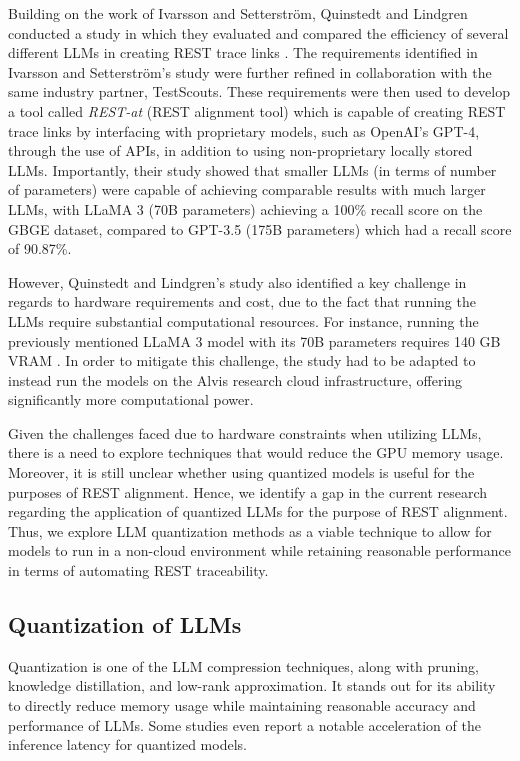 \documentclass[conference]{IEEEtran}
\begin{document}
Building on the work of Ivarsson and Setterström, Quinstedt and Lindgren conducted a study in which they evaluated and compared the efficiency of several different LLMs in creating REST trace links \cite{quinstedt2024Optimizing}. The requirements identified in Ivarsson and Setterström's study \cite{ivarsson2023automated} were further refined in collaboration with the same industry partner, TestScouts. These requirements were then used to develop a tool called \textit{REST-at} (REST alignment tool) which is capable of creating REST trace links by interfacing with proprietary models, such as OpenAI's GPT-4, through the use of APIs, in addition to using non-proprietary locally stored LLMs. Importantly, their study showed that smaller LLMs (in terms of number of parameters) were capable of achieving comparable results with much larger LLMs, with LLaMA 3 (70B parameters) achieving a 100\% recall score on the GBGE dataset, compared to GPT-3.5 (175B parameters) which had a recall score of 90.87\%.

However, Quinstedt and Lindgren's study also identified a key challenge in regards to hardware requirements and cost, due to the fact that running the LLMs require substantial computational resources. For instance, running the previously mentioned LLaMA 3 model with its 70B parameters requires 140 GB VRAM \cite{quinstedt2024Optimizing}. In order to mitigate this challenge, the study had to be adapted to instead run the models on the Alvis research cloud  infrastructure, offering significantly more computational power.

Given the challenges faced due to hardware constraints when utilizing LLMs, there is a need to explore techniques that would reduce the GPU memory usage. Moreover, it is still unclear whether using quantized models is useful for the purposes of REST alignment. Hence, we identify a gap in the current research regarding the application of quantized LLMs for the purpose of REST alignment. Thus, we explore LLM quantization methods as a viable technique to allow for models to run in a non-cloud environment while retaining reasonable performance in terms of automating REST traceability.

\subsection{Quantization of LLMs}

Quantization is one of the LLM compression techniques, along with pruning, knowledge distillation, and low-rank approximation\cite{bai2024beyond}. It stands out for its ability to directly reduce memory usage while maintaining reasonable accuracy and performance of LLMs. Some studies even report a notable acceleration of the inference latency for quantized models\cite{shen2024exploring}.
\end{document}
